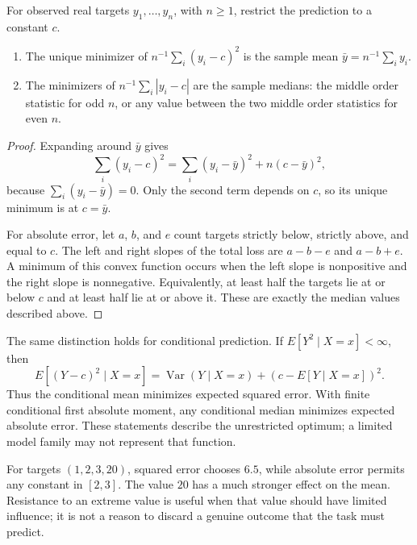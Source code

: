 \par\medskip\noindent\begin{minipage}{\linewidth}
\begin{theorem}
For observed real targets $y_1,\ldots,y_n$, with $n\geq1$, restrict the prediction to a constant $c$.
\begin{enumerate}[leftmargin=*,label=\arabic*.]
\item The unique minimizer of $n^{-1}\sum_i(y_i-c)^2$ is the sample mean $\bar y=n^{-1}\sum_i y_i$.
\item The minimizers of $n^{-1}\sum_i|y_i-c|$ are the sample medians: the middle order statistic for odd $n$, or any value between the two middle order statistics for even $n$.
\end{enumerate}
\end{theorem}

\begin{proof}
Expanding around $\bar y$ gives
\[
\sum_i(y_i-c)^2=\sum_i(y_i-\bar y)^2+n(c-\bar y)^2,
\]
because $\sum_i(y_i-\bar y)=0$. Only the second term depends on $c$, so its unique minimum is at $c=\bar y$.

For absolute error, let $a$, $b$, and $e$ count targets strictly below, strictly above, and equal to $c$. The left and right slopes of the total loss are $a-b-e$ and $a-b+e$. A minimum of this convex function occurs when the left slope is nonpositive and the right slope is nonnegative. Equivalently, at least half the targets lie at or below $c$ and at least half lie at or above it. These are exactly the median values described above.
\end{proof}
\end{minipage}\par\medskip

The same distinction holds for conditional prediction. If $E[Y^2\mid X=x]<\infty$, then
\[
E[(Y-c)^2\mid X=x]
=\operatorname{Var}(Y\mid X=x)+(c-E[Y\mid X=x])^2.
\]
Thus the conditional mean minimizes expected squared error. With finite conditional first absolute moment, any conditional median minimizes expected absolute error. These statements describe the unrestricted optimum; a limited model family may not represent that function.

For targets $(1,2,3,20)$, squared error chooses $6.5$, while absolute error permits any constant in $[2,3]$. The value $20$ has a much stronger effect on the mean. Resistance to an extreme value is useful when that value should have limited influence; it is not a reason to discard a genuine outcome that the task must predict.

